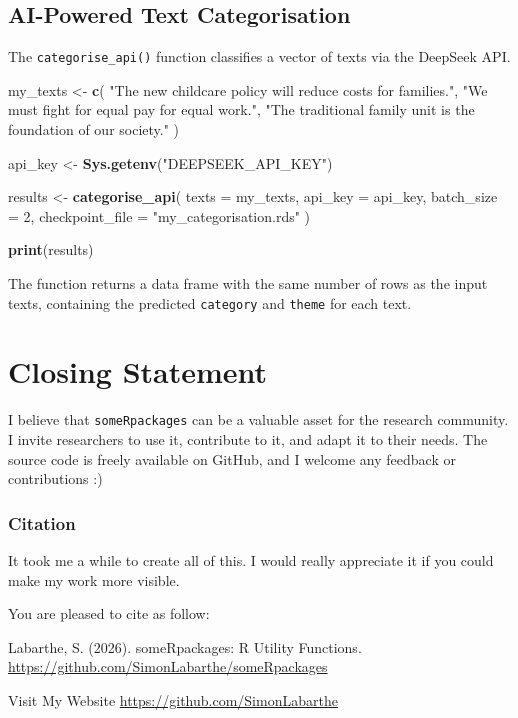 \documentclass[
]{article}
\newenvironment{Shaded}{\begin{snugshade}}{\end{snugshade}}
\newcommand{\AttributeTok}[1]{\textcolor[rgb]{0.13,0.29,0.53}{#1}}
\newcommand{\DecValTok}[1]{\textcolor[rgb]{0.00,0.00,0.81}{#1}}
\newcommand{\FunctionTok}[1]{\textcolor[rgb]{0.13,0.29,0.53}{\textbf{#1}}}
\newcommand{\NormalTok}[1]{#1}
\newcommand{\OtherTok}[1]{\textcolor[rgb]{0.56,0.35,0.01}{#1}}
\newcommand{\StringTok}[1]{\textcolor[rgb]{0.31,0.60,0.02}{#1}}
\begin{document}
\subsection{AI-Powered Text
Categorisation}\label{ai-powered-text-categorisation}

The \texttt{categorise\_api()} function classifies a vector of texts via
the DeepSeek API.

\begin{Shaded}
\begin{Highlighting}[]
\NormalTok{my\_texts }\OtherTok{\textless{}{-}} \FunctionTok{c}\NormalTok{(}
  \StringTok{"The new childcare policy will reduce costs for families."}\NormalTok{,}
  \StringTok{"We must fight for equal pay for equal work."}\NormalTok{,}
  \StringTok{"The traditional family unit is the foundation of our society."}
\NormalTok{)}

\NormalTok{api\_key }\OtherTok{\textless{}{-}} \FunctionTok{Sys.getenv}\NormalTok{(}\StringTok{"DEEPSEEK\_API\_KEY"}\NormalTok{)}

\NormalTok{results }\OtherTok{\textless{}{-}} \FunctionTok{categorise\_api}\NormalTok{(}
  \AttributeTok{texts           =}\NormalTok{ my\_texts,}
  \AttributeTok{api\_key         =}\NormalTok{ api\_key,}
  \AttributeTok{batch\_size      =} \DecValTok{2}\NormalTok{,}
  \AttributeTok{checkpoint\_file =} \StringTok{"my\_categorisation.rds"}
\NormalTok{)}

\FunctionTok{print}\NormalTok{(results)}
\end{Highlighting}
\end{Shaded}

The function returns a data frame with the same number of rows as the
input texts, containing the predicted \texttt{category} and
\texttt{theme} for each text.

\newpage

\section{Closing Statement}\label{closing-statement}

I believe that \texttt{someRpackages} can be a valuable asset for the
research community. I invite researchers to use it, contribute to it,
and adapt it to their needs. The source code is freely available on
GitHub, and I welcome any feedback or contributions :)

\subsubsection{Citation}\label{citation}

It took me a while to create all of this. I would really appreciate it
if you could make my work more visible.

You are pleased to cite as follow:

Labarthe, S. (2026). someRpackages: R Utility Functions.
\url{https://github.com/SimonLabarthe/someRpackages}

Visit My Website \url{https://github.com/SimonLabarthe}
\end{document}
